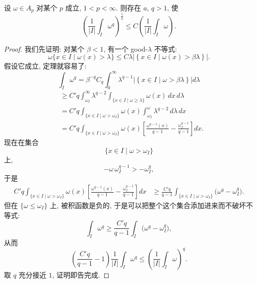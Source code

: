 \begin{theorem}\label{thm:3.7}
设 $\omega\in A_p$ 对某个 $p$ 成立, $1<p<\infty$. 则存在 $a$, $q>1$, 使
\[
\left(\frac{1}{|I|}\int_{I}\omega^{q}\right)^{\frac{1}{q}}\leq C\left(\frac{1}{|I|}\int_{I}\omega\right).
\]
\end{theorem}

\begin{proof}
我们先证明: 对某个 $\beta<1$, 有一个 good-$\lambda$ 不等式:
\[
\omega\{x\in I \mid \omega(x)>\lambda\}\leq C\lambda\left|\left\{x\in I \mid \omega(x)>\beta\lambda\right\}\right|.
\]
假设它成立, 定理就容易了:
\[
\int_{I}\omega^{q}=\beta^{-q}C_{q}\int_{0}^{\infty}\lambda^{q-1}\left|\left\{x\in I \mid \omega>\beta\lambda\right\}\right|d\lambda
\]
\begin{align*}
&\geq C'q\int_{\omega_{I}}^{\infty}\lambda^{q-2}\int_{\{x\in I \mid \omega\geq\lambda\}}\omega(x)\,dx\,d\lambda \\
&=C'q\int_{\{x\in I \mid \omega>\omega_{I}\}}\omega(x)\int_{\omega_{I}}^{\omega}\lambda^{q-2}\,d\lambda\,dx \\
&=C'q\int_{\{x\in I \mid \omega>\omega_{I}\}}\omega(x)\left[\frac{\omega^{q-1}(x)}{q-1}-\frac{\omega_{I}^{q-1}}{q-1}\right]dx.
\end{align*}
现在在集合
\[
\{x\in I \mid \omega>\omega_{I}\}
\]
上,
\[
-\omega\,\omega_{I}^{q-1}>-\omega_{I}^{q},
\]
于是
\begin{align*}
C'q\int_{\{x\in I \mid \omega>\omega_{I}\}}\omega(x)\left[\frac{\omega^{q-1}(x)}{q-1}-\frac{\omega_{I}^{q-1}}{q-1}\right]dx
&\geq\frac{C'q}{q-1}\int_{\{x\in I \mid \omega>\omega_{I}\}}\bigl(\omega^{q}-\omega_{I}^{q}\bigr).
\end{align*}
但在 $\{\omega\leq\omega_I\}$ 上, 被积函数是负的, 于是可以把整个这个集合添加进来而不破坏不等式:
\[
\int_{I}\omega^{q}\geq\frac{C'q}{q-1}\int_{I}\bigl(\omega^{q}-\omega_{I}^{q}\bigr),
\]
从而
\[
\left(\frac{C'q}{q-1}-1\right)\frac{1}{|I|}\int_{I}\omega^{q}\leq\left(\frac{1}{|I|}\int_{I}\omega\right)^{q}.
\]
取 $q$ 充分接近 $1$, 证明即告完成.
\end{proof}

